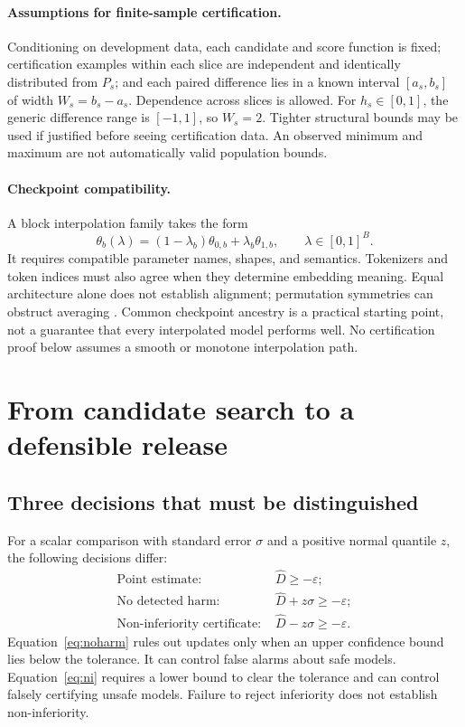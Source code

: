 \documentclass[11pt,letterpaper]{article}
\newcommand{\eps}{\varepsilon}
\begin{document}
\paragraph{Assumptions for finite-sample certification.}
Conditioning on development data, each candidate and score function is fixed; certification examples within each slice are independent and identically distributed from $P_s$; and each paired difference lies in a known interval $[a_s,b_s]$ of width $W_s=b_s-a_s$. Dependence across slices is allowed. For $h_s\in[0,1]$, the generic difference range is $[-1,1]$, so $W_s=2$. Tighter structural bounds may be used if justified before seeing certification data. An observed minimum and maximum are not automatically valid population bounds.

\paragraph{Checkpoint compatibility.}
A block interpolation family takes the form
\begin{equation}
\theta_b(\lambda)=(1-\lambda_b)\theta_{0,b}+\lambda_b\theta_{1,b},
\qquad \lambda\in[0,1]^B.
\label{eq:merge}
\end{equation}
It requires compatible parameter names, shapes, and semantics. Tokenizers and token indices must also agree when they determine embedding meaning. Equal architecture alone does not establish alignment; permutation symmetries can obstruct averaging \citep{ainsworth2023rebasin}. Common checkpoint ancestry is a practical starting point, not a guarantee that every interpolated model performs well. No certification proof below assumes a smooth or monotone interpolation path.

\section{From candidate search to a defensible release}
\label{sec:release}
\subsection{Three decisions that must be distinguished}
For a scalar comparison with standard error $\sigma$ and a positive normal quantile $z$, the following decisions differ:
\begin{align}
\text{Point estimate: }&\widehat D\geq-\eps;\label{eq:point}\\
\text{No detected harm: }&\widehat D+z\sigma\geq-\eps;\label{eq:noharm}\\
\text{Non-inferiority certificate: }&\widehat D-z\sigma\geq-\eps.\label{eq:ni}
\end{align}
Equation~\eqref{eq:noharm} rules out updates only when an upper confidence bound lies below the tolerance. It can control false alarms about safe models. Equation~\eqref{eq:ni} requires a lower bound to clear the tolerance and can control falsely certifying unsafe models. Failure to reject inferiority does not establish non-inferiority.
\end{document}
